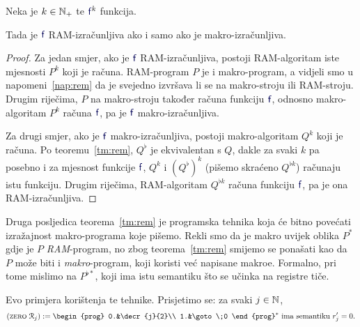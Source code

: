 \begin{korolar}[{name=[RAM-izračunljivost je ekvivalentna makro-izračunljivosti]}]\label{kor:rem}
Neka je $k\in{\mathbb N}_+$ te $\f f^k$ funkcija.

    Tada je $\f f$ RAM-izračunljiva ako i samo ako je makro-izračunljiva.
\end{korolar}
\begin{proof}
Za jedan smjer, ako je $\f f$ RAM-izračunljiva, postoji RAM-algoritam iste mjesnosti $P^k$ koji je računa.  RAM-program $P$ je i makro-program, a vidjeli smo u napomeni~\ref{nap:rem} da je svejedno izvršava li se na makro-stroju ili RAM-stroju. Drugim riječima, $P$ na makro-stroju također računa funkciju $\f f$, odnosno makro-algoritam $P^k$ računa $\f f$, pa je $\f f$ makro-izračunljiva.

Za drugi smjer, ako je $\f f$ makro-izračunljiva, postoji makro-algoritam $Q^k$ koji je računa. Po teoremu~\ref{tm:rem}, $Q^\flat$ je ekvivalentan s $Q$, dakle za svaki $k$ pa posebno i za mjesnost funkcije $\f f$, $Q^k$ i $(Q^\flat)^k$ (pišemo skraćeno $Q^{\flat k}$) računaju istu funkciju. Drugim riječima, RAM-algoritam $Q^{\flat k}$ računa funkciju $\f f$, pa je ona RAM-izračunljiva.
\end{proof}

\begin{napomena}[{name=[makroi višeg reda]}]
Druga posljedica teorema~\ref{tm:rem} je programska tehnika koja će bitno povećati izražajnost makro-programa koje pišemo. Rekli smo da je makro uvijek oblika $P^*$ gdje je $P$ \emph{RAM}-program, no zbog teorema~\ref{tm:rem} smijemo se ponašati kao da $P$ može biti i \emph{makro}-program, koji koristi već napisane makroe. Formalno, pri tome mislimo na $P^{\flat*}$\!, koji ima istu semantiku što se učinka na registre tiče.
\end{napomena}


Evo primjera korištenja te tehnike.
Prisjetimo se: za svaki $j\in{\mathbb N}$,
\begin{equation}
(\textsc{zero}\;\reg{j}):=\begin{prog}
0.&\decr{j}{2}\\
1.&\goto\;0
\end{prog}^*\text{
 ima semantiku $r_j'=0$.}
\end{equation}


